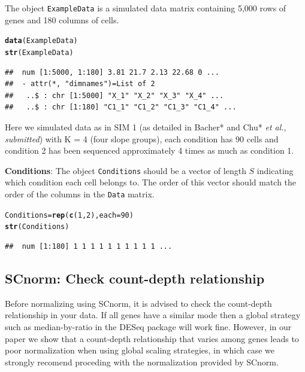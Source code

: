\documentclass{article}\usepackage[]{graphicx}\usepackage[usenames,dvipsnames]{color}
\makeatletter
\newcommand{\hlnum}[1]{\textcolor[rgb]{0.686,0.059,0.569}{#1}}%
\newcommand{\hlstd}[1]{\textcolor[rgb]{0.345,0.345,0.345}{#1}}%
\newcommand{\hlkwb}[1]{\textcolor[rgb]{0.69,0.353,0.396}{#1}}%
\newcommand{\hlkwc}[1]{\textcolor[rgb]{0.333,0.667,0.333}{#1}}%
\newcommand{\hlkwd}[1]{\textcolor[rgb]{0.737,0.353,0.396}{\textbf{#1}}}%
\newenvironment{kframe}{%
 \def\at@end@of@kframe{}%
 \ifinner\ifhmode%
  \def\at@end@of@kframe{\end{minipage}}%
  \begin{minipage}{\columnwidth}%
 \fi\fi%
 \def\FrameCommand##1{\hskip\@totalleftmargin \hskip-\fboxsep
 \colorbox{shadecolor}{##1}\hskip-\fboxsep
     \hskip-\linewidth \hskip-\@totalleftmargin \hskip\columnwidth}%
 \MakeFramed {\advance\hsize-\width
   \@totalleftmargin\z@ \linewidth\hsize
   \@setminipage}}%
 {\par\unskip\endMakeFramed%
 \at@end@of@kframe}
\newenvironment{knitrout}{}{} %
\makeatother
\begin{document}
\noindent The object \verb+ExampleData+ is a simulated data matrix containing
5,000 rows of genes and 180 columns of cells. 

\begin{knitrout}
\color{fgcolor}\begin{kframe}
\begin{alltt}
\hlkwd{data}\hlstd{(ExampleData)}
\hlkwd{str}\hlstd{(ExampleData)}
\end{alltt}
\begin{verbatim}
##  num [1:5000, 1:180] 3.81 21.7 2.13 22.68 0 ...
##  - attr(*, "dimnames")=List of 2
##   ..$ : chr [1:5000] "X_1" "X_2" "X_3" "X_4" ...
##   ..$ : chr [1:180] "C1_1" "C1_2" "C1_3" "C1_4" ...
\end{verbatim}
\end{kframe}
\end{knitrout}
  
  Here we simulated data as in SIM 1 (as detailed in Bacher* and Chu* {\it et al.}, {\it{submitted}}) with K = 4 (four slope groups), each condition has 90 cells and condition 2 has been 
sequenced approximately 4 times as much as condition 1.

{\bf Conditions}: The object \verb+Conditions+ should be a vector of length $S$ indicating which condition each cell belongs to. The order of this vector should match the order of the columns in the \verb+Data+ matrix.
\begin{knitrout}
\color{fgcolor}\begin{kframe}
\begin{alltt}
\hlstd{Conditions} \hlkwb{=} \hlkwd{rep}\hlstd{(}\hlkwd{c}\hlstd{(}\hlnum{1}\hlstd{,}\hlnum{2}\hlstd{),} \hlkwc{each}\hlstd{=} \hlnum{90}\hlstd{)}
\hlkwd{str}\hlstd{(Conditions)}
\end{alltt}
\begin{verbatim}
##  num [1:180] 1 1 1 1 1 1 1 1 1 1 ...
\end{verbatim}
\end{kframe}
\end{knitrout}
  
  
  
  \subsection{SCnorm: Check count-depth relationship}
\label{sec:checkData}
Before normalizing using SCnorm, it is advised to check the count-depth relationship in your data. If all genes have a similar mode then a global strategy such as median-by-ratio in the DESeq package will work fine. However, in our paper we show that a count-depth relationship that varies among genes leads to poor normalization when using global scaling strategies, in which case we strongly recomend proceding with the normalization provided by SCnorm. 
\end{document}
